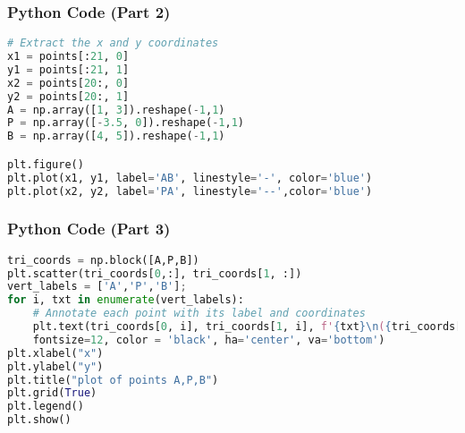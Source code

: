 \documentclass{beamer}
\theoremstyle{remark}
\begin{document}
\begin{frame}[fragile]
\frametitle{Python Code (Part 2)}
\vspace{0.3cm} %
\begin{lstlisting}[language=Python]
# Extract the x and y coordinates
x1 = points[:21, 0]
y1 = points[:21, 1]
x2 = points[20:, 0]
y2 = points[20:, 1]
A = np.array([1, 3]).reshape(-1,1)
P = np.array([-3.5, 0]).reshape(-1,1)
B = np.array([4, 5]).reshape(-1,1)

plt.figure()
plt.plot(x1, y1, label='AB', linestyle='-', color='blue')
plt.plot(x2, y2, label='PA', linestyle='--',color='blue')
\end{lstlisting}
\vspace{0.3cm} %
\end{frame}

\begin{frame}[fragile]
\frametitle{Python Code (Part 3)}
\vspace{0.3cm} %
\begin{lstlisting}[language=Python]
tri_coords = np.block([A,P,B])  
plt.scatter(tri_coords[0,:], tri_coords[1, :])
vert_labels = ['A','P','B'];
for i, txt in enumerate(vert_labels):
    # Annotate each point with its label and coordinates
    plt.text(tri_coords[0, i], tri_coords[1, i], f'{txt}\n({tri_coords[0, i]:.2f}, {tri_coords[1, i]:.2f})',
    fontsize=12, color = 'black', ha='center', va='bottom')
plt.xlabel("x")
plt.ylabel("y")
plt.title("plot of points A,P,B")
plt.grid(True)
plt.legend()
plt.show()
\end{lstlisting}
\vspace{0.3cm} %
\end{frame}
\end{document}
